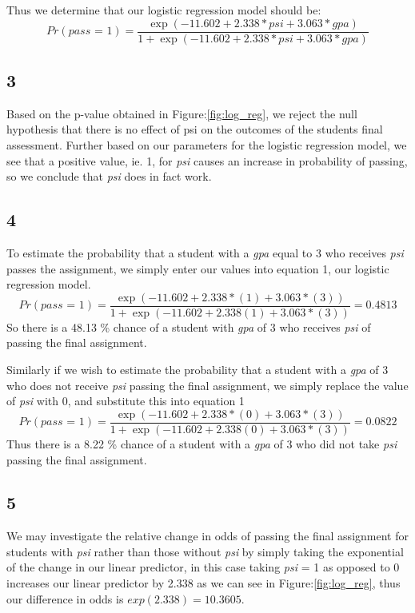 \documentclass{article}
\begin{document}
    Thus we determine that our logistic regression model should be:
    \begin{equation}
   	Pr(\textit{pass = 1}) = \frac{\exp(-11.602 + 2.338*\textit{psi} + 3.063*\textit{gpa})}{1 + \exp(-11.602 + 2.338*\textit{psi} + 3.063*\textit{gpa})}
    \end{equation}
    \subsection*{3}
    Based on the p-value obtained in Figure:\ref{fig:log_reg}, we reject the null hypothesis that there is no effect of psi on the outcomes of the students final assessment. Further based on our parameters for the logistic regression model, we see that a positive value, ie. 1, for \textit{psi} causes an increase in probability of passing, so we conclude that \textit{psi} does in fact work.
    \subsection*{4}
    To estimate the probability that a student with a \textit{gpa} equal to 3 who receives \textit{psi} passes the assignment, we simply enter our values into equation 1, our logistic regression model.
    \[
    Pr(\textit{pass = 1}) = \frac{\exp(-11.602 + 2.338*(1) + 3.063*(3))}{1 + \exp(-11.602 + 2.338(1) + 3.063*(3))} = 0.4813
    \]
    So there is a 48.13 \% chance of a student with \textit{gpa} of 3 who receives \textit{psi} of passing the final assignment.
    
    Similarly if we wish to estimate the probability that a student with a \textit{gpa} of 3 who does not receive \textit{psi} passing the final assignment, we simply replace the value of \textit{psi} with 0, and substitute this into equation 1
    \[
    Pr(\textit{pass = 1}) = \frac{\exp(-11.602 + 2.338*(0) + 3.063*(3))}{1 + \exp(-11.602 + 2.338(0) + 3.063*(3))} = 0.0822
    \]
    Thus there is a 8.22 \% chance of a student with a \textit{gpa} of 3 who did not take \textit{psi} passing the final assignment.
    \subsection*{5}
    We may investigate the relative change in odds of passing the final assignment for students with \textit{psi} rather than those without \textit{psi} by simply taking the exponential of the change in our linear predictor, in this case taking \textit{psi} = 1 as opposed to 0 increases our linear predictor by 2.338 as we can see in Figure:\ref{fig:log_reg}, thus our difference in odds is $exp(2.338) = 10.3605$.
    
\end{document}
